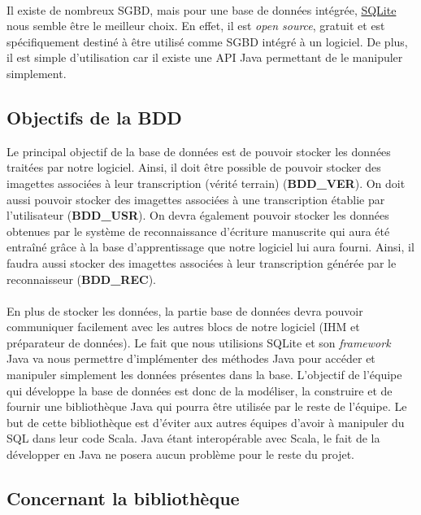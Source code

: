 \paragraph{}
Il existe de nombreux SGBD, mais pour une base de données intégrée,
\href{https://sqlite.org/index.html}{SQLite} nous semble être le meilleur
choix. En effet, il est \textit{open source}, gratuit et est spécifiquement
destiné à être utilisé comme SGBD intégré à un logiciel. De plus, il est
simple d’utilisation car il existe une API Java permettant de le manipuler
simplement.

\subsection{Objectifs de la BDD}

Le principal objectif de la base de données est de pouvoir stocker les données
traitées par notre logiciel. Ainsi, il doit être possible de pouvoir stocker
des imagettes associées à leur transcription (vérité terrain) (\textbf{BDD\_VER}).
On doit aussi pouvoir stocker des imagettes associées à une transcription établie
par l’utilisateur (\textbf{BDD\_USR}). On devra également pouvoir stocker les
données obtenues par le système de reconnaissance d’écriture manuscrite qui aura
été entraîné grâce à la base d’apprentissage que notre logiciel lui aura fourni.
Ainsi, il faudra aussi stocker des imagettes associées à leur transcription
générée par le reconnaisseur (\textbf{BDD\_REC}).

\paragraph{}
En plus de stocker les données, la partie base de données devra pouvoir
communiquer facilement avec les autres blocs de notre logiciel (IHM et
préparateur de données). Le fait que nous utilisions SQLite et son
\textit{framework} Java va nous permettre d’implémenter des méthodes Java pour
accéder et manipuler simplement les données présentes dans la base. L’objectif
de l’équipe qui développe la base de données est donc de la modéliser, la
construire et de fournir une bibliothèque Java qui pourra être utilisée par le
reste de l’équipe. Le but de cette bibliothèque est d’éviter aux autres équipes
d’avoir à manipuler du SQL dans leur code Scala. Java étant interopérable avec
Scala, le fait de la développer en Java ne posera aucun problème pour le reste
du projet.

\subsection{Concernant la bibliothèque}

